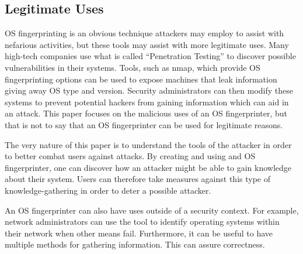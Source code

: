 \subsection{Legitimate Uses}
OS fingerprinting is an obvious technique attackers may employ to assist with nefarious activities, but these tools may assist with more legitimate uses.  Many high-tech companies use what is called ``Penetration Testing'' to discover possible vulnerabilities in their systems.  Tools, such as nmap, which provide OS fingerprinting options can be used to expose machines that leak information giving away OS type and version.  Security administrators can then modify these systems to prevent potential hackers from gaining information which can aid in an attack.
This paper focuses on the malicious uses of an OS fingerprinter, but that is not to say that an OS fingerprinter can be used for legitimate reasons. 

The very nature of this paper is to understand the tools of the attacker in order to better combat users against attacks. By creating and using and OS fingerprinter, one can discover how an attacker might be able to gain knowledge about their system. Users can therefore take measures against this type of knowledge-gathering in order to deter a possible attacker.

An OS fingerprinter can also have uses outside of a security context. For example, network administrators can use the tool to identify operating systems within their network when other means fail. Furthermore, it can be useful to have multiple methods for gathering information. This can assure correctness.
